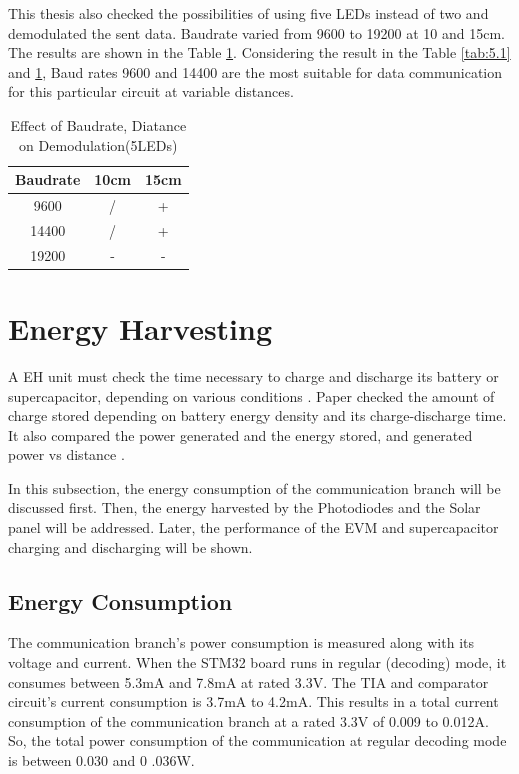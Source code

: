 This thesis also checked the possibilities of using five LEDs instead of two and demodulated the sent data. Baudrate varied from 9600 to 19200 at 10 and 15cm. The results are shown in the Table \ref{tab:5.2}.
Considering the result in the Table \ref{tab:5.1} and \ref{tab:5.2}, Baud rates 9600 and 14400 are the most suitable for data communication for this particular circuit at variable distances. 

\begin{table}
    \centering
    \caption{Effect of Baudrate, Diatance on Demodulation(5LEDs)}
    \begin{tabular}{|c|c|c|}
    \hline
         \textbf{Baudrate} &\textbf{10cm}  &\textbf{15cm} \\
         \hline
         9600 &/  &+   \\
         \hline
         14400 &/  &+   \\
         \hline
         19200 &-  &-   \\
         \hline
    \end{tabular}
    \label{tab:5.2}
\end{table}



\section{Energy Harvesting}

A \ac{EH} unit must check the time necessary to charge and discharge its battery or supercapacitor, depending on various conditions \cite{de2024reconfigurable}. Paper \cite{fong2012integrated} checked the amount of charge stored depending on battery energy density and its charge-discharge time. It also compared the power generated and the energy stored, and generated power vs distance \cite{fong2012integrated}.

In this subsection, the energy consumption of the communication branch will be discussed first. Then, the energy harvested by the Photodiodes and the Solar panel will be addressed. Later, the performance of the \ac{EVM} and supercapacitor charging and discharging will be shown.

\subsection{Energy Consumption}

The communication branch's power consumption is measured along with its voltage and current. When the STM32 board runs in regular (decoding) mode, it consumes between 5.3mA and 7.8mA at rated 3.3V. The TIA and comparator circuit's current consumption is 3.7mA to 4.2mA. This results in a total current consumption of the communication branch at a rated 3.3V of 0.009 to 0.012A. So, the total power consumption of the communication at regular decoding mode is between 0.030 and 0 .036W.

